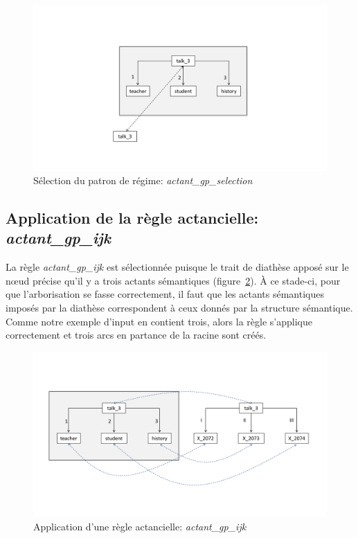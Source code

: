 \begin{figure}[htb]
	\centering
	\includegraphics[width=1\textwidth, trim = {0cm 3.4cm 0cm 4.5cm},clip]{ch6/figs/lexical_root_implem.pdf}
	\caption{Sélection du patron de régime: \emph{actant\_gp\_selection}}
	\label{deroulement1}
\end{figure}

\subsection{Application de la règle actancielle: \emph{actant\_gp\_ijk}}
La règle \emph{actant\_gp\_ijk} est sélectionnée puisque le trait de diathèse apposé sur le n\oe{}ud précise qu'il y a trois actants sémantiques (figure~\ref{deroulement2}). À ce stade-ci, pour que l'arborisation se fasse correctement, il faut que les actants sémantiques imposés par la diathèse correspondent à ceux donnés par la structure sémantique. Comme notre exemple d'input en contient trois, alors la règle s'applique correctement et trois arcs en partance de la racine sont créés.

\begin{figure}[htb]
	\centering
	\includegraphics[width=1\textwidth, trim = {0cm 3.6cm 0cm 4.5cm},clip]{ch6/figs/actant_gp_ijk.pdf}
	\caption{Application d'une règle actancielle: \emph{actant\_gp\_ijk}}
	\label{deroulement2}
\end{figure}

